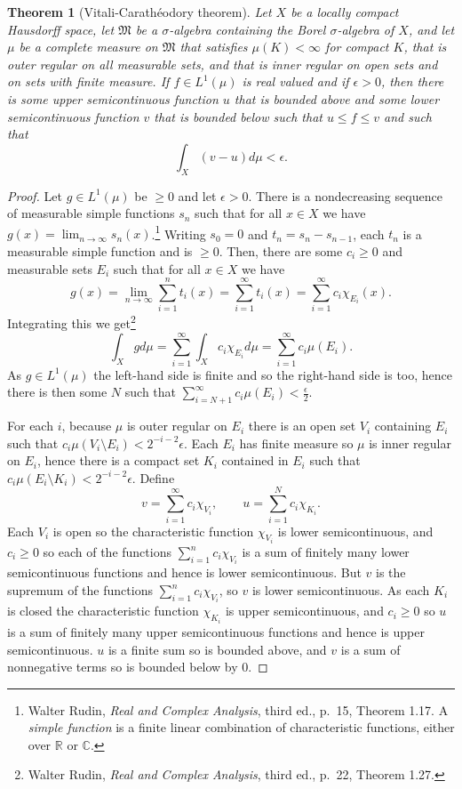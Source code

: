 \documentclass{article}
\newtheorem{theorem}{Theorem}
\theoremstyle{definition}
\begin{document}
\begin{theorem}[Vitali-Carath\'eodory theorem]
Let $X$ be a locally compact Hausdorff space, let $\mathfrak{M}$ be a $\sigma$-algebra containing the Borel $\sigma$-algebra of $X$, and let $\mu$ be a complete
measure on $\mathfrak{M}$ that satisfies $\mu(K) < \infty$ for compact $K$, that is outer regular on all measurable sets, and that is inner regular on open sets and on sets with
finite measure. If $f \in L^1(\mu)$ is real valued and if $\epsilon>0$, then there is some upper semicontinuous function $u$ that is bounded above and some lower semicontinuous
function $v$ that
is bounded below such that
$u \leq f \leq v$ and such that
\[
\int_X (v-u) d\mu <\epsilon.
\]
\label{vitali}
\end{theorem}
\begin{proof}
Let $g \in L^1(\mu)$ be $\geq 0$ and let $\epsilon>0$.
There is a nondecreasing sequence of measurable simple functions $s_n$ such 
that for  all $x \in X$ we have $g(x)=\lim_{n \to \infty} s_n(x)$.\footnote{Walter
Rudin, {\em Real and Complex Analysis}, third ed., p.~15, Theorem 1.17. A {\em simple function} is a finite linear combination of characteristic functions, either over
$\mathbb{R}$ or $\mathbb{C}$.}
Writing $s_0=0$ and $t_n=s_n-s_{n-1}$, each $t_n$ is a measurable simple function and is $\geq 0$.
Then, there are
some $c_i \geq 0$ and measurable sets $E_i$ such that
for  all $x \in X$ we have
\[
g(x) = \lim_{n \to \infty} \sum_{i=1}^n t_i(x) = 
\sum_{i=1}^\infty t_i(x)=\sum_{i=1}^\infty c_i \chi_{E_i}(x).
\]
Integrating this we get\footnote{Walter Rudin, {\em Real and Complex Analysis}, third ed., p.~22, Theorem 1.27.}
\[
\int_X g d\mu = \sum_{i=1}^\infty \int_X c_i \chi_{E_i} d\mu=\sum_{i=1}^\infty c_i \mu(E_i).
\]
As $g \in L^1(\mu)$ the left-hand side is finite and so the right-hand side is too, hence  there is then some $N$ such that 
$\sum_{i=N+1}^\infty c_i \mu(E_i)<\frac{\epsilon}{2}$.

For each $i$, because $\mu$ is outer regular on $E_i$ there is an open set $V_i$ containing $E_i$ such that
$c_i \mu(V_i \setminus E_i) < 2^{-i-2}\epsilon$. Each $E_i$ has finite measure so $\mu$ is inner regular on  $E_i$, hence there
is a compact set $K_i$ contained in $E_i$ such that $c_i \mu(E_i \setminus K_i) < 2^{-i-2}\epsilon$.
Define 
\[
v = \sum_{i=1}^\infty c_i \chi_{V_i}, \qquad u = \sum_{i=1}^N c_i \chi_{K_i}.
\]
Each $V_i$ is open so the characteristic function $\chi_{V_i}$ is lower semicontinuous, and $c_i \geq 0$ so
each of the functions $\sum_{i=1}^n c_i \chi_{V_i}$ is a sum of finitely many lower semicontinuous functions and hence is lower semicontinuous.
But $v$ is the supremum of the  functions $\sum_{i=1}^n c_i \chi_{V_i}$, so  $v$ is lower semicontinuous. 
As each $K_i$ is closed the characteristic function $\chi_{K_i}$ is upper semicontinuous, and $c_i \geq 0$ so $u$ is a sum of finitely many upper semicontinuous functions
and hence is upper semicontinuous. $u$ is a finite sum so is bounded  above, and $v$ is a sum of nonnegative terms so is bounded below by $0$.


\end{proof}
\end{document}
